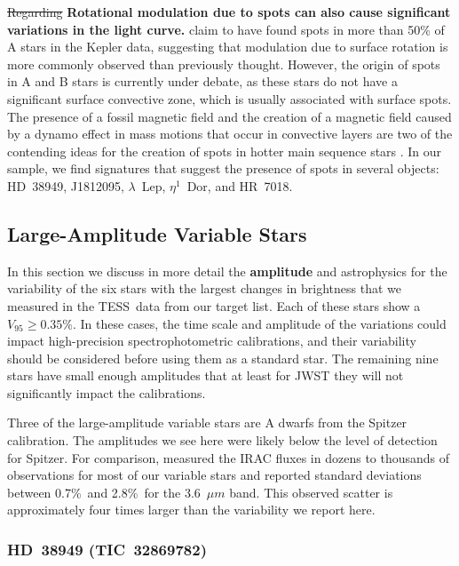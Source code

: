 \documentclass[twocolumn, linenumbers]{aastex631}
\newcommand{\tess}{TESS}
\begin{document}
{\st{Regarding}} {\bf{Rotational modulation due to spots can also cause significant variations in the light curve.}} \citet{Balona2013, Balona2017} claim to have found spots in more than 50\% of A stars in the Kepler data, suggesting that modulation due to surface rotation is more commonly observed than previously thought. However, the origin of spots in A and B stars is currently under debate, as these stars do not have a significant surface convective zone, which is usually associated with surface spots. The presence of a fossil magnetic field \citep{Parker1955} and the creation of a magnetic field caused by a dynamo effect in mass motions that occur in convective layers \citep{Charbonneau2014} are two of the contending ideas for the creation of spots in hotter main sequence stars {\bf\citep{Balona2021}}. In our sample, we find signatures that suggest the presence of spots in several objects:  HD~38949, J1812095, $\lambda$~Lep, $\eta^1$~Dor, and HR~7018.



\subsection{Large-Amplitude Variable Stars} %


In this section we discuss in more detail the \textbf{amplitude} and astrophysics for the variability of the six stars with the largest changes in brightness that we measured in the \tess\ data from our target list. Each of these stars show a $V_{95}\ge0.35$\%. In these cases, the time scale and amplitude of the variations could impact high-precision spectrophotometric calibrations, and their variability should be considered before using them as a standard star. The remaining nine stars have small enough amplitudes that at least for JWST they will not significantly impact the calibrations. 

Three of the large-amplitude variable stars are A dwarfs from the \citet{Reach2005} Spitzer calibration. The amplitudes we see here were likely below the level of detection for Spitzer. For comparison, \citet{Krick2021IRAC} measured the IRAC fluxes in dozens to thousands of observations for most of our variable stars and reported standard deviations between 0.7\%\ and 2.8\%\ for the 3.6~$\mu m$ band.  This observed scatter is approximately four times larger than the variability we report here.


\subsubsection{HD~38949 (TIC~32869782)}
\end{document}
